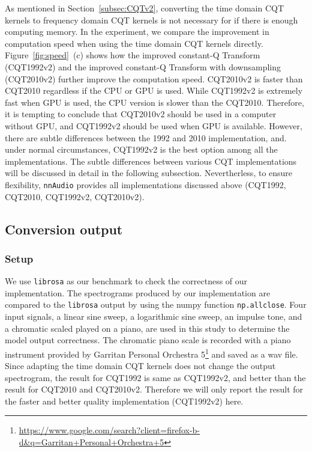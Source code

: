 \documentclass{ieeeaccess}
\newcommand{\nbh}[1]{\texttt{#1}}
\begin{document}
As mentioned in Section~\ref{subsec:CQTv2}, converting the time domain CQT kernels to frequency domain CQT kernels is not necessary for if there is enough computing memory. In the experiment, we compare the improvement in computation speed when using the time domain CQT kernels directly. Figure~\ref{fig:speed}~(c) shows how the improved constant-Q Transform (CQT1992v2) and the improved constant-Q Transform with downsampling (CQT2010v2) further improve the computation speed. CQT2010v2 is faster than CQT2010 regardless if the CPU or GPU is used. While CQT1992v2 is extremely fast when GPU is used, the CPU version is slower than the CQT2010. Therefore, it is tempting to conclude that CQT2010v2 should be used in a computer without GPU, and CQT1992v2 should be used when GPU is available. However, there are subtle differences between the 1992 and 2010 implementation, and. under normal circumstances, CQT1992v2 is the best option among all the implementations. The subtle differences between various CQT implementations will be discussed in detail in the following subsection. Nevertherless, to ensure flexibility, \nbh{nnAudio} provides all implementations discussed above (CQT1992, CQT2010, CQT1992v2, CQT2010v2). 





\subsection{Conversion output}

\subsubsection{Setup}
We use \nbh{librosa} as our benchmark to check the correctness of our implementation. The spectrograms produced by our implementation are compared to the \nbh{librosa} output by using the numpy function \nbh{np.allclose}. Four input signals, a linear sine sweep, a logarithmic sine sweep, an impulse tone, and a chromatic scaled played on a piano, are used in this study to determine the model output correctness. The chromatic piano scale is recorded with a piano instrument provided by Garritan Personal Orchestra 5\footnote{\url{https://www.google.com/search?client=firefox-b-d\&q=Garritan+Personal+Orchestra+5}} and saved as a wav file. Since adapting the time domain CQT kernels does not change the output spectrogram, the result for CQT1992 is same as CQT1992v2, and better than the result for CQT2010 and CQT2010v2. Therefore we will only report the result for the faster and better quality implementation (CQT1992v2) here.
\end{document}
